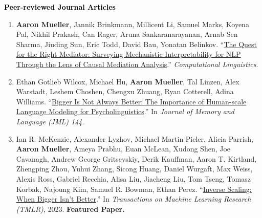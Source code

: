 \documentclass[10pt]{article}
\renewcommand{\subsection}[1]{\textcolor{black}{#1}}
\newcommand{\halfblankline}{\quad\vspace{-0.5\baselineskip}\pagebreak[3]}
\providecommand*\titlelink[2]{\href{#1}{\textcolor{accent}{#2}}}
\begin{document}
	\subsection{\textbf{Peer-reviewed Journal Articles}}
	\begin{enumerate}[leftmargin=*, topsep=0pt, itemsep=0.25ex, partopsep=0ex, parsep=1ex, label=J\arabic*., ref=J\arabic*]

	\item \textbf{Aaron Mueller}, Jannik Brinkmann, Millicent Li, Samuel Marks, Koyena Pal, Nikhil Prakash, Can Rager, Aruna Sankaranarayanan, Arnab Sen Sharma, Jiuding Sun, Eric Todd, David Bau, Yonatan Belinkov. ``\titlelink{https://direct.mit.edu/coli/article/doi/10.1162/COLI.a.572/133277/The-Quest-for-the-Right-Mediator-Surveying}{The Quest for the Right Mediator:  Surveying Mechanistic Interpretability for NLP Through the Lens of Causal Mediation Analysis}.'' \emph{Computational Linguistics}.
	
	\item Ethan Gotlieb Wilcox, Michael Hu, \textbf{Aaron Mueller}, Tal Linzen, Alex Warstadt, Leshem Choshen, Chengxu Zhuang, Ryan Cotterell, Adina Williams. ``\titlelink{https://osf.io/preprints/psyarxiv/rfwgd}{Bigger Is Not Always Better: The Importance of Human-scale Language Modeling for Psycholinguistics}.'' In \emph{Journal of Memory and Language (JML) 144}.

	\item Ian R. McKenzie, Alexander Lyzhov, Michael Martin Pieler, Alicia Parrish, \textbf{Aaron Mueller}, Ameya Prabhu, Euan McLean, Xudong Shen, Joe Cavanagh, Andrew George Gritsevskiy, Derik Kauffman, Aaron T. Kirtland, Zhengping Zhou, Yuhui Zhang, Sicong Huang, Daniel Wurgaft, Max Weiss, Alexis Ross, Gabriel Recchia, Alisa Liu, Jiacheng Liu, Tom Tseng, Tomasz Korbak, Najoung Kim, Samuel R. Bowman, Ethan Perez. ``\titlelink{https://arxiv.org/abs/2306.09479}{Inverse Scaling: When Bigger Isn't Better}.'' In \emph{Transactions on Machine Learning Research (TMLR)}, 2023. \textbf{\textcolor{accent}{Featured Paper.}}

	\end{enumerate}

	\halfblankline
\end{document}
